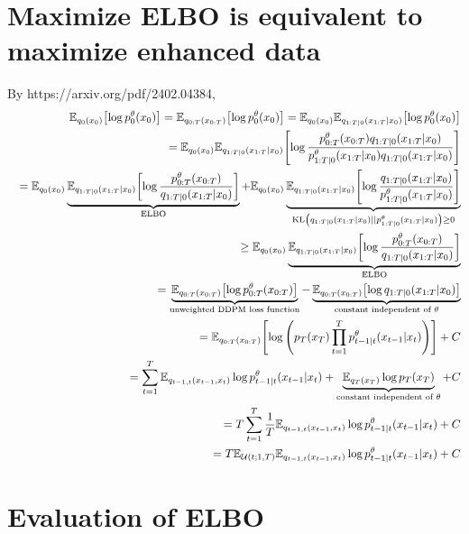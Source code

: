 \documentclass[10pt]{article}
\begin{document}
\section{Maximize ELBO is equivalent to maximize enhanced data}
By https://arxiv.org/pdf/2402.04384,
\begin{eqnarray*}
  &&\mathbb{E}_{q_0(x_0)}\qty[\log p_0^\theta(x_0)]=\mathbb{E}_{q_{0:T}(x_{0:T})}\qty[\log p_0^{\theta}(x_0)]=\mathbb{E}_{q_0(x_0)}\mathbb{E}_{q_{1:T|0}(x_{1:T}|x_0)}\qty[\log p_0^{\theta}(x_0)]\\
  &&=\mathbb{E}_{q_0(x_0)}\mathbb{E}_{q_{1:T|0}(x_{1:T}|x_0)}\qty[\log \frac{p_{0:T}^{\theta}(x_{0:T})q_{1:T|0}(x_{1:T}|x_0)}{p_{1:T|0}^{\theta}(x_{1:T}|x_0)q_{1:T|0}(x_{1:T}|x_0)}]\\
  &&=\mathbb{E}_{q_0(x_0)}\underbrace{\mathbb{E}_{q_{1:T|0}(x_{1:T}|x_0)}\qty[\log \frac{p_{0:T}^{\theta}(x_{0:T})}{q_{1:T|0}(x_{1:T}|x_0)}]}_\text{ELBO} + \mathbb{E}_{q_0(x_0)}\underbrace{\mathbb{E}_{q_{1:T|0}(x_{1:T}|x_0)}\qty[\log \frac{q_{1:T|0}(x_{1:T}|x_0)}{p_{1:T|0}^{\theta}(x_{1:T}|x_0)}]}_{\text{KL}\qty(q_{1:T|0}(x_{1:T}|x_0)||p_{1:T|0}^{\theta}(x_{1:T}|x_0))\ge 0}\\
  &&\ge \mathbb{E}_{q_0(x_0)}\underbrace{\mathbb{E}_{q_{1:T|0}(x_{1:T}|x_0)}\qty[\log \frac{p_{0:T}^{\theta}(x_{0:T})}{q_{1:T|0}(x_{1:T}|x_0)}]}_\text{ELBO}\\
  &&=\underbrace{\mathbb{E}_{q_{0:T}(x_{0:T})}\qty[\log p_{0:T}^{\theta}(x_{0:T})]}_\text{unweighted DDPM loss function} - \underbrace{\mathbb{E}_{q_{0:T}(x_{0:T})}\qty[\log q_{1:T|0}(x_{1:T}|x_0)]}_\text{constant independent of $\theta$}\\
  &&=\mathbb{E}_{q_{0:T}(x_{0:T})}\qty[\log \qty(p_T(x_T)\prod_{t=1}^{T} p_{t-1|t}^{\theta}(x_{t-1}|x_t))] + C\\
  &&=\sum_{t=1}^T\mathbb{E}_{q_{t-1,t}(x_{t-1},x_t)}\log p_{t-1|t}^\theta(x_{t-1}|x_t) + \underbrace{\mathbb{E}_{q_T(x_T)} \log p_T(x_T)}_\text{constant independent of $\theta$} + C\\
  &&=T\sum_{t=1}^T \frac{1}{T}\mathbb{E}_{q_{t-1,t}(x_{t-1},x_t)}\log p_{t-1|t}^\theta(x_{t-1}|x_t) + C\\
  &&=T\mathbb{E}_{\mathcal{U}(t;1,T)}\mathbb{E}_{q_{t-1,t}(x_{t-1},x_t)}\log p_{t-1|t}^\theta(x_{t-1}|x_t) + C
\end{eqnarray*}

\section{Evaluation of ELBO}
\end{document}
